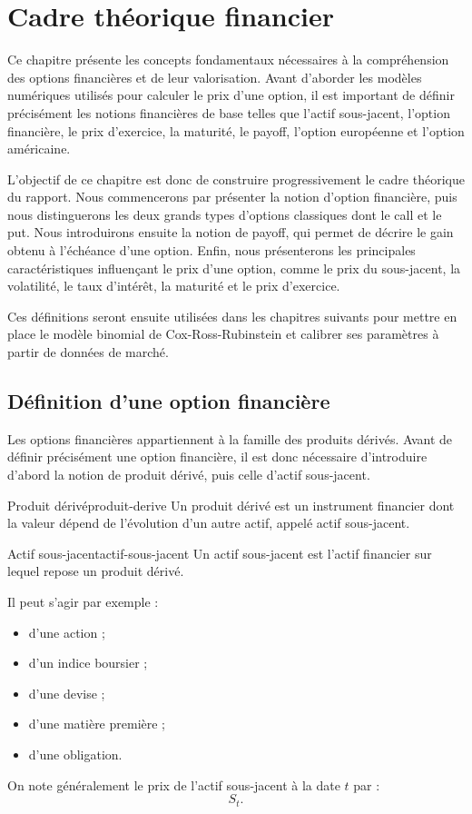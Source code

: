 \documentclass[11pt]{report}
\begin{document}
\chapter{Cadre théorique financier}

Ce chapitre présente les concepts fondamentaux nécessaires à la compréhension des options financières et de leur valorisation. Avant d’aborder les modèles numériques utilisés pour calculer le prix d’une option, il est important de définir précisément les notions financières de base telles que l'actif sous-jacent, l'option financière, le prix d'exercice, la maturité, le payoff, l'option européenne et l'option américaine.

L’objectif de ce chapitre est donc de construire progressivement le cadre théorique du rapport. Nous commencerons par présenter la notion d’option financière, puis nous distinguerons les deux grands types d’options classiques dont le call et le put. Nous introduirons ensuite la notion de payoff, qui permet de décrire le gain obtenu à l’échéance d’une option. Enfin, nous présenterons les principales caractéristiques influençant le prix d’une option, comme le prix du sous-jacent, la volatilité, le taux d’intérêt, la maturité et le prix d’exercice.

Ces définitions seront ensuite utilisées dans les chapitres suivants pour mettre en place le modèle binomial de Cox-Ross-Rubinstein et calibrer ses paramètres à partir de données de marché.

\section{Définition d'une option financière}

Les options financières appartiennent à la famille des produits dérivés. Avant de définir précisément une option financière, il est donc nécessaire d'introduire d'abord la notion de produit dérivé, puis celle d'actif sous-jacent.

\begin{definition}{Produit dérivé}{produit-derive}
Un produit dérivé est un instrument financier dont la valeur dépend de l'évolution d'un autre actif, appelé actif sous-jacent.
\end{definition}

\begin{definition}{Actif sous-jacent}{actif-sous-jacent}
Un actif sous-jacent est l'actif financier sur lequel repose un produit dérivé.

Il peut s'agir par exemple :
\begin{itemize}
    \item d'une action ;
    \item d'un indice boursier ;
    \item d'une devise ;
    \item d'une matière première ;
    \item d'une obligation.
\end{itemize}

On note généralement le prix de l'actif sous-jacent à la date $t$ par :
\[
S_t.
\]
\end{definition}
\end{document}
